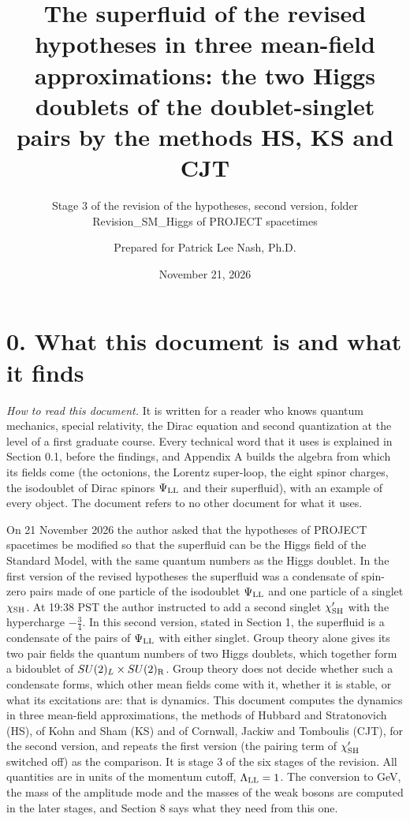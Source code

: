 \documentclass[
  10pt,
]{article}
\title{The superfluid of the revised hypotheses in three mean-field
approximations: the two Higgs doublets of the doublet-singlet pairs by
the methods HS, KS and CJT}
\subtitle{Stage 3 of the revision of the hypotheses, second version,
folder Revision\_SM\_Higgs of PROJECT spacetimes}
\author{Prepared for Patrick Lee Nash, Ph.D.}
\date{November 21, 2026}
\begin{document}
\maketitle

\hypertarget{what-this-document-is-and-what-it-finds}{%
\section{0. What this document is and what it
finds}\label{what-this-document-is-and-what-it-finds}}

\emph{How to read this document.} It is written for a reader who knows
quantum mechanics, special relativity, the Dirac equation and second
quantization at the level of a first graduate course. Every technical
word that it uses is explained in Section 0.1, before the findings, and
Appendix A builds the algebra from which its fields come (the octonions,
the Lorentz super-loop, the eight spinor charges, the isodoublet of
Dirac spinors \(\Psi_{\rm LL}\) and their superfluid), with an example
of every object. The document refers to no other document for what it
uses.

On 21 November 2026 the author asked that the hypotheses of PROJECT
spacetimes be modified so that the superfluid can be the Higgs field of
the Standard Model, with the same quantum numbers as the Higgs doublet.
In the first version of the revised hypotheses the superfluid was a
condensate of spin-zero pairs made of one particle of the isodoublet
\(\Psi_{\rm LL}\) and one particle of a singlet \(\chi_{\rm SH}\). At
19:38 PST the author instructed to add a second singlet
\(\chi'_{\rm SH}\) with the hypercharge \(-\tfrac34\). In this second
version, stated in Section 1, the superfluid is a condensate of the
pairs of \(\Psi_{\rm LL}\) with either singlet. Group theory alone gives
its two pair fields the quantum numbers of two Higgs doublets, which
together form a bidoublet of \(SU(2)_L\times SU(2)_{\rm R}\). Group
theory does not decide whether such a condensate forms, which other mean
fields come with it, whether it is stable, or what its excitations are:
that is dynamics. This document computes the dynamics in three
mean-field approximations, the methods of Hubbard and Stratonovich (HS),
of Kohn and Sham (KS) and of Cornwall, Jackiw and Tomboulis (CJT), for
the second version, and repeats the first version (the pairing term of
\(\chi'_{\rm SH}\) switched off) as the comparison. It is stage 3 of the
six stages of the revision. All quantities are in units of the momentum
cutoff, \(\Lambda_{\rm LL}=1\). The conversion to GeV, the mass of the
amplitude mode and the masses of the weak bosons are computed in the
later stages, and Section 8 says what they need from this one.
\end{document}
